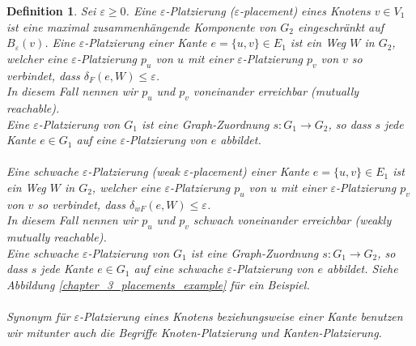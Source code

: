 \documentclass[a4paper, 12pt, twoside]{article}
\theoremstyle{Format1} %
\newtheorem{Def}{Definition}[section]       %
\begin{document}
\begin{Def}
	Sei $\varepsilon \geq 0$.
	Eine \textit{$\varepsilon$-Platzierung ($\varepsilon$-placement) eines Knotens $v \in V_1$} ist eine maximal zusammenhängende Komponente von $G_2$ eingeschränkt auf $B_{\varepsilon}(v)$.
	Eine \textit{$\varepsilon$-Platzierung einer Kante $e = \{u,v\} \in E_1$} ist ein Weg $W$ in $G_2$, welcher eine $\varepsilon$-Platzierung $p_u$ von $u$ mit einer $\varepsilon$-Platzierung $p_v$ von $v$
	so verbindet, dass $\delta_F(e, W) \leq \varepsilon$.
	\\
	In diesem Fall nennen wir $p_u$ und $p_v$ \textit{voneinander erreichbar (mutually reachable)}.
	\\
	Eine \textit{$\varepsilon$-Platzierung von $G_1$} ist eine Graph-Zuordnung $s: G_1 \to G_2$, so dass $s$ jede Kante $e \in G_1$ auf eine $\varepsilon$-Platzierung von $e$ abbildet.
	\\
	\\
	Eine \textit{schwache $\varepsilon$-Platzierung (weak $\varepsilon$-placement) einer Kante $e = \{u,v\} \in E_1$} ist ein Weg $W$ in $G_2$, welcher eine $\varepsilon$-Platzierung $p_u$ von $u$
	mit einer $\varepsilon$-Platzierung $p_v$ von $v$ so verbindet, dass $\delta_{wF}(e, W) \leq \varepsilon$.
	\\
	In diesem Fall nennen wir $p_u$ und $p_v$ \textit{schwach voneinander erreichbar (weakly mutually reachable)}.
	\\
	Eine schwache \textit{$\varepsilon$-Platzierung von $G_1$} ist eine Graph-Zuordnung $s: G_1 \to G_2$, so dass $s$ jede Kante $e \in G_1$ auf eine schwache $\varepsilon$-Platzierung von $e$ abbildet.
	Siehe Abbildung \ref{chapter_3_placements_example} für ein Beispiel.
	\\
	\\
	Synonym für $\varepsilon$-Platzierung eines Knotens beziehungsweise einer Kante benutzen wir mitunter auch die Begriffe \textit{Knoten-Platzierung} und \textit{Kanten-Platzierung}.


\end{Def}
\end{document}
